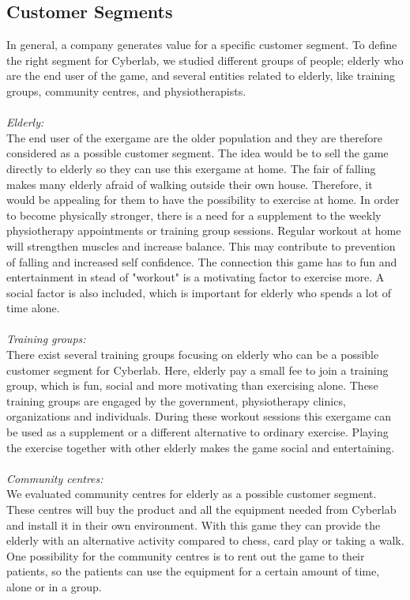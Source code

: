\subsection{Customer Segments}
In general, a company generates value for a specific customer segment. To define the right segment for Cyberlab, we studied different groups of people; elderly who are the end user of the game, and several entities related to elderly, like training groups, community centres, and physiotherapists.\\ \\ 
\emph{Elderly:}\\ 
The end user of the exergame are the older population and they are therefore considered as a possible customer segment. The idea would be to sell the game directly to elderly so they can use this exergame at home. The fair of falling makes many elderly afraid of walking outside their own house. Therefore, it would be appealing for them to have the possibility to exercise at home. In order to become physically stronger, there is a need for a supplement to the weekly physiotherapy appointments or training group sessions. Regular workout at home will strengthen muscles and increase balance.  This may contribute to prevention of falling and increased self confidence. The connection this game has to fun and entertainment in stead of "workout" is a motivating factor to exercise more. A social factor is also included, which is important for elderly who spends a lot of time alone. \\ \\
\emph{Training groups:}\\ 
There exist several training groups focusing on elderly who can be a possible customer segment for Cyberlab. Here, elderly pay a small fee to join a training group, which is fun, social and more motivating than exercising alone. These training groups are engaged by the government, physiotherapy clinics, organizations and individuals. During these workout sessions this exergame can be used as a supplement or a different alternative to ordinary exercise. Playing the exercise together with other elderly makes the game social and entertaining. \\ \\
\emph{Community centres:} \\
We evaluated community centres for elderly as a possible customer segment. These centres will buy the product and all the equipment needed from Cyberlab and install it in their own environment. With this game they can provide the elderly with an alternative activity compared to chess, card play or taking a walk. One possibility for the community centres is to rent out the game to their patients, so the patients can use the equipment for a certain amount of time, alone or in a group. \\ \\
